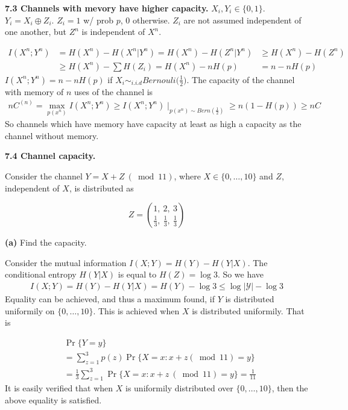 \documentclass[10pt]{article}
\newcommand{\setbrace}[1]{{\{#1\}}}
\begin{document}
\begin{tiny}
\begin{multicols}{3}
\textbf{\scriptsize 7.3 Channels with mevory have higher capacity.}
    $X_i, Y_i \in \{0,1\}$.
    $Y_i = X_i \oplus Z_i$.
    $Z_i = 1$ w/ prob $p$, 0 otherwise.
    $Z_i$ are not assumed independent of one another, but $Z^n$ is independent of $X^n$.

\begin{align}
    I(X^n;Y^n) &= H(X^n) - H(X^n|Y^n) = H(X^n) - H(Z^n|Y^n) &\ge H(X^n) - H(Z^n) \nonumber\\
    &\ge H(X^n) - \sum H(Z_i) = H(X^n) - nH(p) &= n - nH(p) \nonumber
\end{align}
$I(X^n;Y^n) = n - nH(p)$ if $X_i \sim_{i.i.d} Bernouli\big(\frac{1}{2}\big)$.
The capacity of the channel with memory of $n$ uses of the channel is
\begin{align*}
    nC^{(n)} = \max_{p(x^n)} I(X^n; Y^n) 
        \ge I(X^n;Y^n)\mid_{p(x^n) \sim Bern(\frac{1}{2})} 
        \ge n ( 1 - H(p)) \ge nC
\end{align*}
So channels which have memory have capacity at least as high a capacity as the channel without memory.

\textbf{\scriptsize 7.4 Channel capacity.}

Consider the channel $Y=X+Z\ (\bmod 11)$, where $X \in \setbrace{0,\dots,10}$ and $Z$, independent of $X$, is distributed as

\begin{equation*}
    Z = {{1,\ 2,\ 3}\choose{\frac{1}{3},\ \frac{1}{3},\ \frac{1}{3}}}
\end{equation*}


\textbf{(a)} Find the capacity.

Consider the mutual information $I(X;Y) = H(Y) - H(Y|X)$. The conditional
entropy $H(Y|X)$ is equal to $H(Z)=\log 3$.
So we have
\begin{eqnarray*}
    I(X;Y) = H(Y) - H(Y|X) = H(Y) - \log 3 
    \leq \log {\vert \mathcal{Y} \vert} - \log 3 \label{eq:7.4-cap}
\end{eqnarray*}
Equality can be achieved, and thus a maximum found, if $Y$ is distributed
uniformily on $\setbrace{0,\dots,10}$. This is achieved when $X$ is
distributed uniformily. That is


\begin{align*}
    &\Pr \setbrace{Y=y} \\
    &= \sum_{z=1}^{3}p(z) \Pr \setbrace{X=x : x+z (\bmod 11) = y} \\
    &= \frac{1}{3}\sum_{z=1}^{3} \Pr \setbrace{X = x : x+z\ (\bmod 11) = y} = \frac{1}{11}
\end{align*}
It is easily verified that when $X$ is uniformily distributed over
$\setbrace{0,\dots,10}$, then the above equality is satisfied.


\end{multicols}
\end{tiny}
\end{document}
